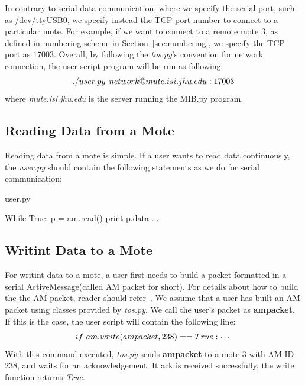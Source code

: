 \documentclass[10pt,conference]{IEEEtran}
\begin{document}
In contrary to serial data communication, where we specify the serial port,
such as /dev/ttyUSB0, we specify instead the TCP port number to connect to a
particular mote.  For example, if we want to connect to a remote mote $3$, as
defined in numbering scheme in Section~\ref{sec:numbering}, we specify the TCP
port as $17003$.  Overall, by following the \textit{tos.py}'s convention for
network connection, the user script program will be run as following: 
\begin{equation}
\label{eqn:command}
\small
./user.py \hspace{1.5mm} network@mute.isi.jhu.edu:17003
\end{equation}
where \textit{mute.isi.jhu.edu} is the server running the MIB.py program.

\subsection{Reading Data from a Mote}
Reading data from a mote is simple.  If a user wants to read data continuously,
the \textit{user.py} should contain the following statements as we do for serial 
communication:
\begin{algorithm}
\caption{user.py}\label{user.py}
\begin{algorithmic}
  \State While True:
    \State \hspace{5.2mm}p = am.read()
    \State \hspace{5.2mm}print p.data
  \State ...
\end{algorithmic}
\end{algorithm}

\subsection{Writint Data to a Mote}\label{sec:write}
For writint data to a mote, a user first needs to build a packet formatted in a
serial ActiveMessage(called AM packet for short).  For details about how to
build the the AM packet, reader should refer~\cite{tos.py}.  We assume that a
user has built an AM packet using classes provided by \textit{tos.py}.  We call
the user's packet as \textbf{ampacket}.  If this is the case, the user script
will contain the following line:
\[
if\hspace{1.2mm} am.write(ampacket, 238) == True: \cdots
\]
With this command executed, \textit{tos.py} sends \textbf{ampacket} to a mote
$3$ with AM ID $238$, and waits for an acknowledgement.  It ack is received
successfully, the write function returns \textit{True}.
\end{document}
